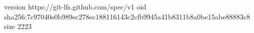 version https://git-lfs.github.com/spec/v1
oid sha256:7c97040e0b989ec278ec188116143c2cfb9945a41b8311b8a0be15abe88883c8
size 2223
